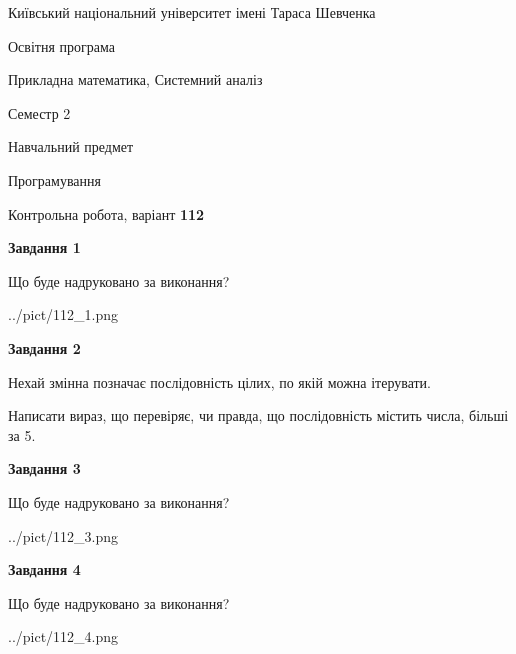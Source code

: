 \documentclass[12pt, ukrainian]{article}
\begin{document}
{{\begin {small}\par
{ \center  Київський національний університет імені Тараса Шевченка \par}
{\parbox {5 cm}{Освітня програма \hfill}{\parbox {8 cm}{Прикладна математика, Системний аналіз \hfill}}\parbox {5 cm}{\hfill Семестр 2}}\par
{\parbox {5 cm} {Навчальний предмет \hfill}\parbox {7 cm}{Програмування \hfill}\parbox {6cm}{\hfill}\par}\vspace{-7pt} \end{small}}{\center Контрольна робота, варіант  \No \textbf
{ 112 }\par}}
{
\begin {large}
{\begin {center}\textbf{Завдання 1}\end {center}}\par
Що буде надруковано за виконання?\par\par
\begin{center}
	{../pict/112_1.png}
\end{center}
\newpage

{\begin {center}\textbf{Завдання 2}\end {center}}\par
Нехай змінна  позначає послідовність цілих, по якій можна ітерувати.

Написати вираз, що перевіряє, чи правда, що послідовність  містить числа, більші за 5.\par
\newpage

{\begin {center}\textbf{Завдання 3}\end {center}}\par
Що буде надруковано за виконання?\par
\begin{center}
	{../pict/112_3.png}
\end{center}
\newpage

{\begin {center}\textbf{Завдання 4}\end {center}}\par
Що буде надруковано за виконання?\par
\begin{center}
	{../pict/112_4.png}
\end{center}
\newpage


\end{large}}
\end{document}
